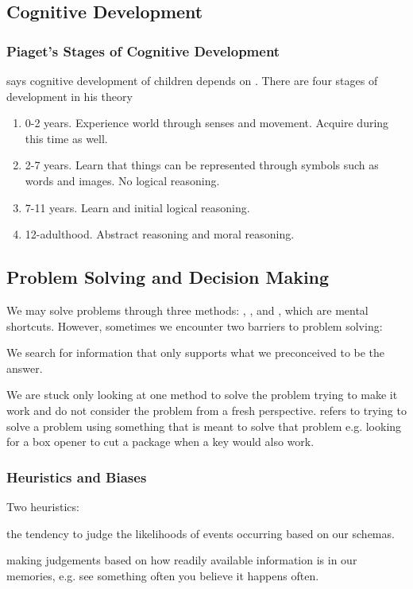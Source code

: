 \documentclass[../Psych_Soci_review.tex]{subfiles}
\begin{document}
\subsection{Cognitive Development}
\subsubsection{Piaget's Stages of Cognitive Development}
 says cognitive development of children depends on
. There are four stages of development in his theory
\begin{enumerate}
  \item {} 0-2 years. Experience world through senses
    and movement. Acquire  during this time as well.
  \item {} 2-7 years. Learn that things can be
    represented through symbols such as words and images. No logical reasoning.
  \item {} 7-11 years. Learn
     and initial logical reasoning.
  \item {} 12-adulthood. Abstract reasoning and
    moral reasoning.
\end{enumerate}

\subsection{Problem Solving and Decision Making}
We may solve problems through three methods: ,
, and , which are mental shortcuts.
However, sometimes we encounter two barriers to problem solving:
\begin{description}
  \item {} We search for information that only supports
    what we preconceived to be the answer.
  \item {} We are stuck only looking at one method to solve the
    problem trying to make it work and do not consider the problem from a fresh
    perspective.  refers to trying to solve a
    problem using something that is meant to solve that problem e.g. looking for
    a box opener to cut a package when a key would also work.
\end{description}

\subsubsection{Heuristics and Biases}
Two heuristics:
\begin{description}
  \item {} the tendency to judge the
    likelihoods of events occurring based on our schemas.
  \item {} making judgements based on how readily
    available information is in our memories, e.g. see something often you
    believe it happens often.
\end{description}
\end{document}
